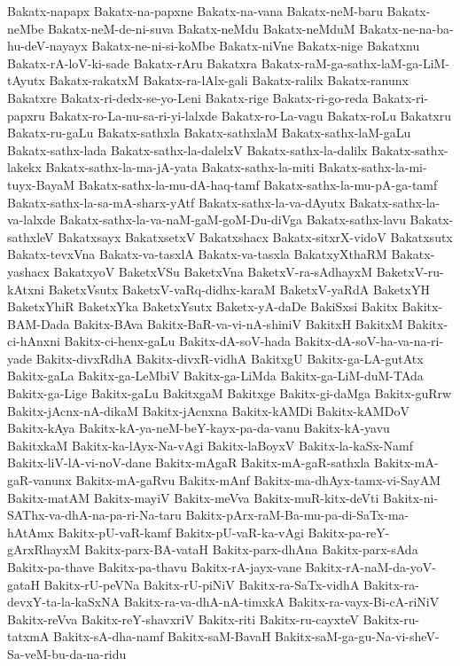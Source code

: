 {Bakatx-napapx
Bakatx-na-papxne
Bakatx-na-vana
Bakatx-neM-baru
Bakatx-neMbe
Bakatx-neM-de-ni-suva
Bakatx-neMdu
Bakatx-neMduM
Bakatx-ne-na-ba-hu-deV-nayayx
Bakatx-ne-ni-si-koMbe
Bakatx-niVne
Bakatx-nige
Bakatxnu
Bakatx-rA-loV-ki-sade
Bakatx-rAru
Bakatxra
Bakatx-raM-ga-sathx-laM-ga-LiM-tAyutx
Bakatx-rakatxM
Bakatx-ra-lAlx-gali
Bakatx-ralilx
Bakatx-ranunx
Bakatxre
Bakatx-ri-dedx-se-yo-Leni
Bakatx-rige
Bakatx-ri-go-reda
Bakatx-ri-papxru
Bakatx-ro-La-nu-sa-ri-yi-lalxde
Bakatx-ro-La-vagu
Bakatx-roLu
Bakatxru
Bakatx-ru-gaLu
Bakatx-sathxla
Bakatx-sathxlaM
Bakatx-sathx-laM-gaLu
Bakatx-sathx-lada
Bakatx-sathx-la-dalelxV
Bakatx-sathx-la-dalilx
Bakatx-sathx-lakekx
Bakatx-sathx-la-ma-jA-yata
Bakatx-sathx-la-miti
Bakatx-sathx-la-mi-tuyx-BayaM
Bakatx-sathx-la-mu-dA-haq-tamf
Bakatx-sathx-la-mu-pA-ga-tamf
Bakatx-sathx-la-sa-mA-sharx-yAtf
Bakatx-sathx-la-va-dAyutx
Bakatx-sathx-la-va-lalxde
Bakatx-sathx-la-va-naM-gaM-goM-Du-diVga
Bakatx-sathx-lavu
Bakatx-sathxleV
Bakatxsayx
BakatxsetxV
Bakatxshacx
Bakatx-sitxrX-vidoV
Bakatxsutx
Bakatx-tevxVna
Bakatx-va-tasxlA
Bakatx-va-tasxla
BakatxyXthaRM
Bakatx-yashacx
BakatxyoV
BaketxVSu
BaketxVna
BaketxV-ra-sAdhayxM
BaketxV-ru-kAtxni
BaketxVsutx
BaketxV-vaRq-didhx-karaM
BaketxV-yaRdA
BaketxYH
BaketxYhiR
BaketxYka
BaketxYsutx
Baketx-yA-daDe
BakiSxsi
Bakitx
Bakitx-BAM-Dada
Bakitx-BAva
Bakitx-BaR-va-vi-nA-shiniV
BakitxH
BakitxM
Bakitx-ci-hAnxni
Bakitx-ci-henx-gaLu
Bakitx-dA-soV-hada
Bakitx-dA-soV-ha-va-na-ri-yade
Bakitx-divxRdhA
Bakitx-divxR-vidhA
BakitxgU
Bakitx-ga-LA-gutAtx
Bakitx-gaLa
Bakitx-ga-LeMbiV
Bakitx-ga-LiMda
Bakitx-ga-LiM-duM-TAda
Bakitx-ga-Lige
Bakitx-gaLu
BakitxgaM
Bakitxge
Bakitx-gi-daMga
Bakitx-guRrw
Bakitx-jAcnx-nA-dikaM
Bakitx-jAcnxna
Bakitx-kAMDi
Bakitx-kAMDoV
Bakitx-kAya
Bakitx-kA-ya-neM-beY-kayx-pa-da-vanu
Bakitx-kA-yavu
BakitxkaM
Bakitx-ka-lAyx-Na-vAgi
Bakitx-laBoyxV
Bakitx-la-kaSx-Namf
Bakitx-liV-lA-vi-noV-dane
Bakitx-mAgaR
Bakitx-mA-gaR-sathxla
Bakitx-mA-gaR-vanunx
Bakitx-mA-gaRvu
Bakitx-mAnf
Bakitx-ma-dhAyx-tamx-vi-SayAM
Bakitx-matAM
Bakitx-mayiV
Bakitx-meVva
Bakitx-muR-kitx-deVti
Bakitx-ni-SAThx-va-dhA-na-pa-ri-Na-taru
Bakitx-pArx-raM-Ba-mu-pa-di-SaTx-ma-hAtAmx
Bakitx-pU-vaR-kamf
Bakitx-pU-vaR-ka-vAgi
Bakitx-pa-reY-gArxRhayxM
Bakitx-parx-BA-vataH
Bakitx-parx-dhAna
Bakitx-parx-sAda
Bakitx-pa-thave
Bakitx-pa-thavu
Bakitx-rA-jayx-vane
Bakitx-rA-naM-da-yoV-gataH
Bakitx-rU-peVNa
Bakitx-rU-piNiV
Bakitx-ra-SaTx-vidhA
Bakitx-ra-devxY-ta-la-kaSxNA
Bakitx-ra-va-dhA-nA-timxkA
Bakitx-ra-vayx-Bi-cA-riNiV
Bakitx-reVva
Bakitx-reY-shavxriV
Bakitx-riti
Bakitx-ru-cayxteV
Bakitx-ru-tatxmA
Bakitx-sA-dha-namf
Bakitx-saM-BavaH
Bakitx-saM-ga-gu-Na-vi-sheV-Sa-veM-bu-da-na-ridu
}
